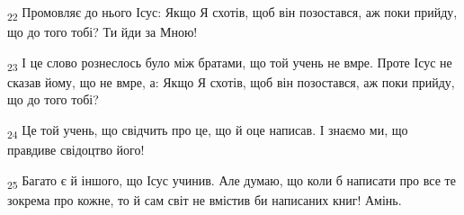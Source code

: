 \begin{tcolorbox}
\textsubscript{22} Промовляє до нього Ісус: Якщо Я схотів, щоб він позостався, аж поки прийду, що до того тобі? Ти йди за Мною!
\end{tcolorbox}
\begin{tcolorbox}
\textsubscript{23} І це слово рознеслось було між братами, що той учень не вмре. Проте Ісус не сказав йому, що не вмре, а: Якщо Я схотів, щоб він позостався, аж поки прийду, що до того тобі?
\end{tcolorbox}
\begin{tcolorbox}
\textsubscript{24} Це той учень, що свідчить про це, що й оце написав. І знаємо ми, що правдиве свідоцтво його!
\end{tcolorbox}
\begin{tcolorbox}
\textsubscript{25} Багато є й іншого, що Ісус учинив. Але думаю, що коли б написати про все те зокрема про кожне, то й сам світ не вмістив би написаних книг! Амінь.
\end{tcolorbox}
